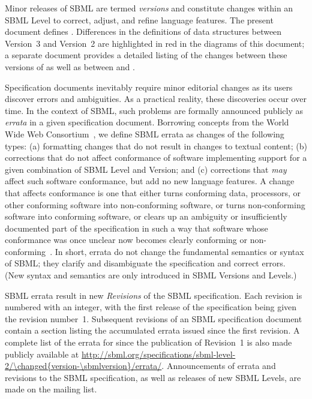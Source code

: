 Minor releases of SBML are termed \emph{versions} and constitute
changes within an SBML Level to correct, adjust, and refine
language features.  The present document defines .
Differences in the definitions of data structures between
Version~3 and Version~2 are highlighted in red in the diagrams of
this document; a separate document provides a detailed listing of
the changes between these versions of \sbmltwo as well as between
\changed{\sbmltwothree} and \sbmlonetwo.

Specification documents inevitably require minor editorial changes
as its users discover errors and ambiguities.  As a practical
reality, these discoveries occur over time.  In the context of
SBML, such problems are formally announced publicly as
\emph{errata} in a given specification document.  Borrowing
concepts from the World Wide Web Consortium~\citep{jacobs:2004},
we define SBML errata as changes of the following types: (a)
formatting changes that do not result in changes to textual
content; (b) corrections that do not affect conformance of
software implementing support for a given combination of SBML
Level and Version; and (c) corrections that \emph{may} affect such
software conformance, but add no new language features.  A change
that affects conformance is one that either turns conforming data,
processors, or other conforming software into non-conforming
software, or turns non-conforming software into conforming
software, or clears up an ambiguity or insufficiently documented
part of the specification in such a way that software whose
conformance was once unclear now becomes clearly conforming or
non-conforming~\citep{jacobs:2004}.  In short, errata do not
change the fundamental semantics or syntax of SBML; they clarify
and disambiguate the specification and correct errors.  (New
syntax and semantics are only introduced in SBML Versions and
Levels.)

SBML errata result in new \emph{Revisions} of the SBML
specification.  Each revision is numbered with an integer, with
the first release of the specification being given the revision
number~1.  Subsequent revisions of an SBML specification document
contain a section listing the accumulated errata issued since the
first revision.  A complete list of the errata for \changed{\sbmltwothree}
since the publication of Revision~1 is also made publicly
available at
\url{http://sbml.org/specifications/sbml-level-2/\changed{version-\sbmlversion}/errata/}.
Announcements of errata and revisions to the SBML specification,
as well as releases of new SBML Levels, are made on the
 mailing
list.


